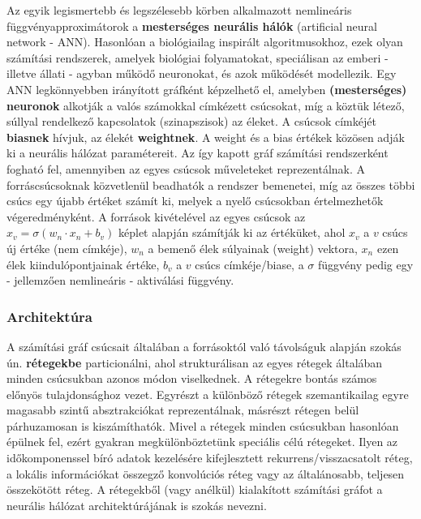 Az egyik legismertebb és legszélesebb körben alkalmazott nemlineáris függvényapproximátorok a \textbf{mesterséges neurális hálók} (artificial neural network - ANN). Hasonlóan a biológiailag inspirált algoritmusokhoz, ezek olyan számítási rendszerek, amelyek biológiai folyamatokat, speciálisan az emberi - illetve állati - agyban működő neuronokat, és azok működését modellezik. Egy ANN legkönnyebben irányított gráfként képzelhető el, amelyben \textbf{(mesterséges) neuronok} alkotják a valós számokkal címkézett csúcsokat, míg a köztük létező, súllyal rendelkező kapcsolatok (szinapszisok) az éleket. A csúcsok címkéjét \textbf{biasnek} hívjuk, az élekét \textbf{weightnek}. A weight és a bias értékek közösen adják ki a neurális hálózat paramétereit. Az így kapott gráf számítási rendszerként fogható fel, amennyiben az egyes csúcsok műveleteket reprezentálnak. A forráscsúcsoknak közvetlenül beadhatók a rendszer bemenetei, míg az összes többi csúcs egy újabb értéket számít ki, melyek a nyelő csúcsokban értelmezhetők végeredményként. A források kivételével az egyes csúcsok az $x_v=\sigma(w_n \cdot x_n +b_v)$ képlet alapján számítják ki az értéküket, ahol $x_v$ a $v$ csúcs új értéke (nem címkéje), $w_n$ a bemenő élek súlyainak (weight) vektora, $x_n$ ezen élek kiindulópontjainak értéke, $b_v$ a $v$ csúcs címkéje/biase, a $\sigma$ függvény pedig egy - jellemzően nemlineáris - aktiválási függvény.

\subsubsection{Architektúra}

A számítási gráf csúcsait általában a forrásoktól való távolságuk alapján szokás ún. \textbf{rétegekbe} particionálni, ahol strukturálisan az egyes rétegek általában minden csúcsukban azonos módon viselkednek. A rétegekre bontás számos előnyös tulajdonsághoz vezet. Egyrészt a különböző rétegek szemantikailag egyre magasabb szintű absztrakciókat reprezentálnak, másrészt rétegen belül párhuzamosan is kiszámíthatók.
Mivel a rétegek minden csúcsukban hasonlóan épülnek fel, ezért gyakran megkülönböztetünk speciális célú rétegeket. Ilyen az időkomponenssel bíró adatok kezelésére kifejlesztett rekurrens/visszacsatolt réteg, a lokális információkat összegző konvolúciós réteg vagy az általánosabb, teljesen összekötött réteg. A rétegekből (vagy anélkül) kialakított számítási gráfot a neurális hálózat architektúrájának is szokás nevezni.


